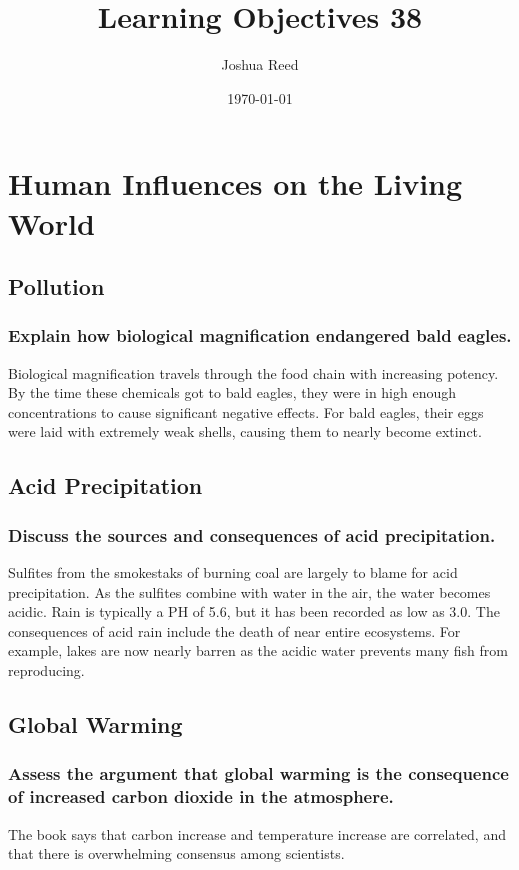 \documentclass[a4paper]{article}
\title{Learning Objectives 38}
\author{Joshua Reed}
\date{\today}
\begin{document}
\maketitle


\section{Human Influences on the Living World}
\subsection{Pollution}
\subsubsection{Explain how biological magnification endangered bald eagles.}
Biological magnification travels through the food chain with increasing potency. By the time these chemicals got to bald eagles, they
were in high enough concentrations to cause significant negative effects. For bald eagles, their eggs were laid with extremely weak shells,
causing them to nearly become extinct.

\subsection{Acid Precipitation}
\subsubsection{Discuss the sources and consequences of acid precipitation.}
Sulfites from the smokestaks of burning coal are largely to blame for acid precipitation. As the sulfites combine with water in the 
air, the water becomes acidic. Rain is typically a PH of 5.6, but it has been recorded as low as 3.0. The consequences of acid
rain include the death of near entire ecosystems. For example, lakes are now nearly barren as the acidic water prevents many fish
from reproducing.

\subsection{Global Warming}
\subsubsection{Assess the argument that global warming is the consequence of increased carbon dioxide in the atmosphere.}
The book says that carbon increase and temperature increase are correlated, and that there is overwhelming consensus among 
scientists. 
\end{document}
